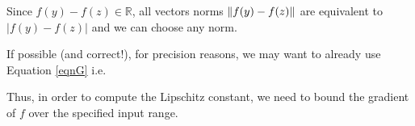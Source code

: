 Since $f(y) - f(z) \in \mathbb{R}$, all vectors norms $\lVert f(y) - f(z) \rVert$
are equivalent to $|f(y) - f(z)|$ and we can choose any norm.

If possible (and correct!), for precision reasons, we may want to already use Equation \ref{eqnG}  i.e.

Thus, in order to compute the Lipschitz constant, we need to bound the gradient of $f$
over the specified input range.
